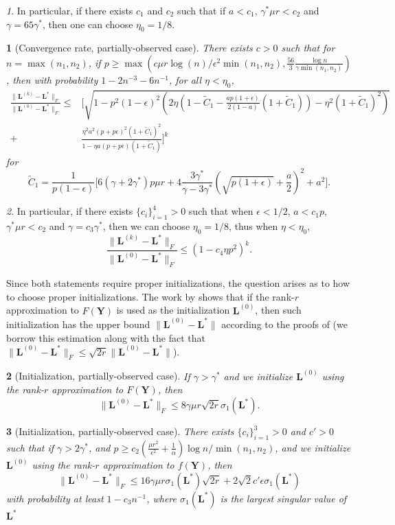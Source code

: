 \documentclass[12pt]{article}
\newcommand{\bL}{\boldsymbol{L}}
\def\bY{\boldsymbol{Y}}
\theoremstyle{plain}
\theoremstyle{definition}
\theoremstyle{plain}
\newtheorem{thm}{\protect\theoremname}
\theoremstyle{plain}
\theoremstyle{remark}
\newtheorem{rem}{\protect\remarkname}
\providecommand{\remarkname}{Remark}
\providecommand{\theoremname}{Theorem}
\begin{document}
\begin{rem}
In particular, if there exists $c_1$ and $c_2$ such that if $a<c_1$, $\gamma^*\mu r<c_2$ and $\gamma=65\gamma^*$, then one can choose $\eta_0=1/8$.
\end{rem}

\begin{thm}[Convergence rate, partially-observed case]\label{thm:main2}
There exists $c>0$ such that for $n=\max(n_1,n_2)$, if $p\geq \max(c\mu r\log(n)/\epsilon^2\min(n_1,n_2),\frac{56}{3}\frac{\log n}{\gamma \min(n_1,n_2)})$, then with probability $1-2n^{-3}-6n^{-1}$, for all $\eta<\eta_0$,
\begin{align*}
\frac{\|\bL^{(k)}-\bL^*\|_F}{\|\bL^{(0)}-\bL^*\|_F}\leq&\Big[\sqrt{1-p^2(1-\epsilon)^2\left(2\eta\left(1-\tilde{C}_1-\frac{ap(1+\epsilon)}{2(1-a)}(1+\tilde{C}_1)\right)-\eta^2(1+\tilde{C}_1)^2\right)}\\+&\frac{\eta^2a^2(p+p\epsilon)^2(1+\tilde{C}_1)^2}{1-\eta a(p+p\epsilon)(1+\tilde{C}_1)}\Big]^k 
\end{align*}
for 
\[
\tilde{C}_1=\frac{1}{p(1-\epsilon)}\Big[6(\gamma+2\gamma^*)p\mu r+4\frac{3\gamma^*}{\gamma-3\gamma^*}(\sqrt{p(1+\epsilon)}+\frac{a}{2})^2+a^2\Big].
\]
\end{thm}
\begin{rem}
In particular, if there exists $\{c_i\}_{i=1}^4>0$ such that when $\epsilon<1/2$, $a<c_1p$, $\gamma^*\mu r<c_2$ and $\gamma=c_3\gamma^*$, then we can choose $\eta_0=1/8$, thus when $\eta<\eta_0$, 
\[
\frac{\|\bL^{(k)}-\bL^*\|_F}{\|\bL^{(0)}-\bL^*\|_F}\leq (1-c_4 \eta p^2)^k.
\]
\end{rem}

Since both statements require proper initializations, the question arises as to how to choose  proper initializations. The work by \cite{DBLP:conf/nips/YiPCC16} shows that if the rank-$r$ approximation to $F(\bY)$ is used as the initialization $\bL^{(0)}$, then such initialization has the upper bound $\|\bL^{(0)}-\bL^*\|$ according to the proofs of \cite[Theorems 1 and 3]{DBLP:conf/nips/YiPCC16} (we borrow this estimation along with the fact that $\|\bL^{(0)}-\bL^*\|_F\leq \sqrt{2r}\|\bL^{(0)}-\bL^*\|$).
\begin{thm}[Initialization, partially-observed case]\label{thm:initialization}
If $\gamma>\gamma^*$ and we initialize $\bL^{(0)}$ using the rank-$r$ approximation to $F(\bY)$, then
\[
\|\bL^{(0)}-\bL^*\|_F\leq 8\gamma \mu r \sqrt{2r}\sigma_1(\bL^*).
\]
\end{thm}
\begin{thm}[Initialization, partially-observed case]\label{thm:initialization2}
There exists $\{c_i\}_{i=1}^3>0$ and $c'>0$ such that if  $\gamma>2\gamma^*$, and $p\geq c_2(\frac{\mu r^2}{\epsilon^2}+\frac{1}{\alpha})\log n/\min(n_1,n_2)$, and we initialize $\bL^{(0)}$ using the rank-$r$ approximation to $f(\bY)$, then
\[
\|\bL^{(0)}-\bL^*\|_F\leq 16 \gamma \mu r \sigma_1(\bL^*)\sqrt{2r} + 2\sqrt{2} c'\epsilon \sigma_1(\bL^*)
\]
with probability at least $1-c_3n^{-1}$, where $\sigma_1(\bL^*)$ is the largest singular value of $\bL^*$
\end{thm}
  
\end{document}
